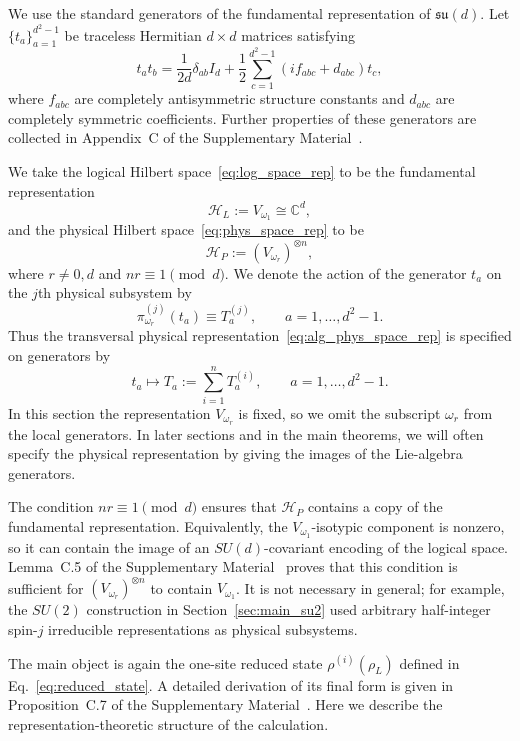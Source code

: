 \documentclass[10pt,twocolumn,superscriptaddress,aps,amsmath,amssymb,citeautoscript,floatfix,prx,longbibliography]{revtex4-2}
\newcounter{alg}
\theoremstyle{plain}
\theoremstyle{plain}
\theoremstyle{plain}
\theoremstyle{plain}
\theoremstyle{plain}
\theoremstyle{plain}
\begin{document}
We use the standard generators of the fundamental representation of $\mathfrak{su}(d)$. Let $\{t_a\}_{a=1}^{d^2-1}$ be traceless Hermitian $d\times d$ matrices satisfying
\begin{equation}
    t_a t_b
    =
    \frac{1}{2d}\delta_{ab}I_d
    +
    \frac12
    \sum_{c=1}^{d^2-1}
    \left(i f_{abc}+d_{abc}\right)t_c ,
\end{equation}
where $f_{abc}$ are completely antisymmetric structure constants and $d_{abc}$ are completely symmetric coefficients. Further properties of these generators are collected in Appendix~C of the Supplementary Material~\cite{SuppMat}.

We take the logical Hilbert space~\eqref{eq:log_space_rep} to be the fundamental representation
$$
    \mathcal H_L:=V_{\omega_1}\cong \mathbb C^d ,
$$
and the physical Hilbert space~\eqref{eq:phys_space_rep} to be
$$
    \mathcal H_P:=(V_{\omega_r})^{\otimes n},
$$
where $r\neq 0,d$ and $nr\equiv 1\pmod d$. We denote the action of the generator $t_a$ on the $j$th physical subsystem by
$$
    \pi_{\omega_r}^{(j)}(t_a)\equiv T_a^{(j)},
    \qquad
    a=1,\ldots,d^2-1 .
$$
Thus the transversal physical representation~\eqref{eq:alg_phys_space_rep} is specified on generators by
$$
    t_a
    \longmapsto
    T_a
    :=
    \sum_{i=1}^n T_a^{(i)},
    \qquad
    a=1,\ldots,d^2-1 .
$$
In this section the representation $V_{\omega_r}$ is fixed, so we omit the subscript $\omega_r$ from the local generators. In later sections and in the main theorems, we will often specify the physical representation by giving the images of the Lie-algebra generators.

The condition $nr\equiv 1\pmod d$ ensures that $\mathcal H_P$ contains a copy of the fundamental representation. Equivalently, the $V_{\omega_1}$-isotypic component is nonzero, so it can contain the image of an $SU(d)$-covariant encoding of the logical space. Lemma~C.5 of the Supplementary Material~\cite{SuppMat} proves that this condition is sufficient for $(V_{\omega_r})^{\otimes n}$ to contain $V_{\omega_1}$. It is not necessary in general; for example, the $SU(2)$ construction in Section~\ref{sec:main_su2} used arbitrary half-integer spin-$j$ irreducible representations as physical subsystems.

The main object is again the one-site reduced state $\rho^{(i)}(\rho_L)$ defined in Eq.~\eqref{eq:reduced_state}. A detailed derivation of its final form is given in Proposition~C.7 of the Supplementary Material~\cite{SuppMat}. Here we describe the representation-theoretic structure of the calculation.
\end{document}
